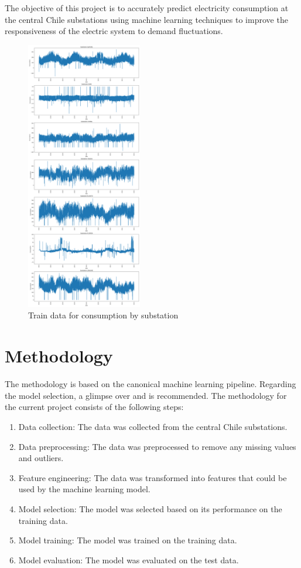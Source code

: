 \documentclass{ieeeaccess}
\begin{document}
The objective of this project is to accurately predict electricity consumption at the central Chile substations using machine learning techniques to improve the responsiveness of the electric system to demand fluctuations.

\begin{figure}[h]
\centering
\includegraphics[width=0.45\textwidth]{consumption_by_substation}
\caption{Train data for consumption by substation}
\label{fig:figure_consumption_by_substation}
\end{figure}

\section{Methodology}\label{s:methodology}

The methodology is based on the canonical machine learning pipeline. Regarding the model selection, a glimpse over \cite{1} and \cite{2} is recommended.
The methodology for the current project consists of the following steps:

\begin{enumerate}
\item Data collection: The data was collected from the central Chile substations.	
\item Data preprocessing: The data was preprocessed to remove any missing values and outliers.
\item Feature engineering: The data was transformed into features that could be used by the machine learning model.
\item Model selection: The model was selected based on its performance on the training data.
\item Model training: The model was trained on the training data.
\item Model evaluation: The model was evaluated on the test data.
\end{enumerate}
\end{document}

